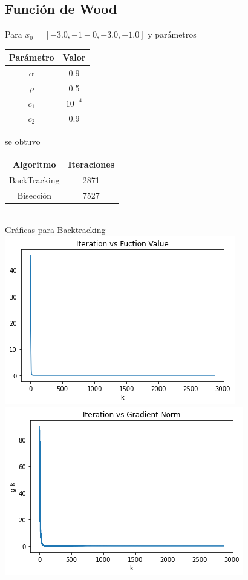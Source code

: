 \documentclass[11pt,letterpaper]{article}
\theoremstyle{definition}
\theoremstyle{definition}
\theoremstyle{definition}
\begin{document}
\subsection{Función de Wood}
Para $ x_0 = [-3.0, -1-0, -3.0, -1.0] $ y parámetros
\begin{center}
	\begin{tabular}{cc}
		\hline
		Parámetro & Valor \\
		\hline
		$\alpha $ & 0.9 \\
		$ \rho $  & 0.5 \\
		$ c_1 $ & $ 10^{-4} $ \\
		$ c_2 $  & $ 0.9 $ \\
		\hline
	\end{tabular}
\end{center}
se obtuvo
\begin{center}
	\begin{tabular}{cc}
		\hline
		Algoritmo & Iteraciones \\
		\hline
		BackTracking & 2871 \\
		Bisección  & 7527 \\
		\hline
	\end{tabular}
	\\
	Gráficas para Backtracking
	\\
	\includegraphics[width=0.8\linewidth]{graficas/wood_backtracking_f}
	\\
	\includegraphics[width=0.8\linewidth]{graficas/wood_backtracking_g}

\end{center}
\end{document}
